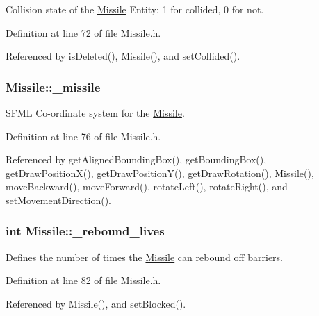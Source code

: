 Collision state of the \hyperlink{classMissile}{Missile} Entity\-: 1 for collided, 0 for not. 



Definition at line 72 of file Missile.\-h.



Referenced by is\-Deleted(), Missile(), and set\-Collided().

\hypertarget{classMissile_ae8ef6a656e69ac376dbc0db1b7153250}{
\subsubsection[{\-\_\-missile}]{ Missile\-::\-\_\-missile\hspace{0.3cm}{\ttfamily [private]}}}\label{classMissile_ae8ef6a656e69ac376dbc0db1b7153250}


S\-F\-M\-L Co-\/ordinate system for the \hyperlink{classMissile}{Missile}. 



Definition at line 76 of file Missile.\-h.



Referenced by get\-Aligned\-Bounding\-Box(), get\-Bounding\-Box(), get\-Draw\-Position\-X(), get\-Draw\-Position\-Y(), get\-Draw\-Rotation(), Missile(), move\-Backward(), move\-Forward(), rotate\-Left(), rotate\-Right(), and set\-Movement\-Direction().

\hypertarget{classMissile_afc61d2903e66bc48c42bb70e7ddd55d8}{
\subsubsection[{\-\_\-rebound\-\_\-lives}]{\setlength{\rightskip}{0pt plus 5cm}int Missile\-::\-\_\-rebound\-\_\-lives\hspace{0.3cm}{\ttfamily [private]}}}\label{classMissile_afc61d2903e66bc48c42bb70e7ddd55d8}


Defines the number of times the \hyperlink{classMissile}{Missile} can rebound off barriers. 



Definition at line 82 of file Missile.\-h.



Referenced by Missile(), and set\-Blocked().

